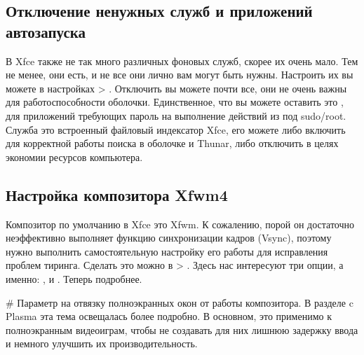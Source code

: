 \documentclass[letterpaper,10pt,russian,openany]{sphinxmanual}
\begin{document}
\subsection{Отключение ненужных служб и приложений автозапуска}
\label{\detokenize{source/de-optimizations:disabling-xfce-daemons}}\label{\detokenize{source/de-optimizations:index-19}}\label{\detokenize{source/de-optimizations:id9}}
\sphinxAtStartPar
В Xfce также не так много различных фоновых служб, скорее их очень мало.
Тем не менее, они есть, и не все они лично вам могут быть нужны.
Настроить их вы можете в настройках  \sphinxhyphen{}> .
Отключить вы можете почти все, они не очень важны для работоспособности оболочки.
Единственное, что вы можете оставить \sphinxhyphen{} это , для приложений требующих пароль на выполнение действий из под sudo/root.
Служба  \sphinxhyphen{} это встроенный файловый индексатор Xfce, его можете либо включить для корректной работы поиска в оболочке и Thunar,
либо отключить в целях экономии ресурсов компьютера.

\noindent{}

\ignorespaces 

\subsection{Настройка композитора Xfwm4}
\label{\detokenize{source/de-optimizations:xfwm4}}\label{\detokenize{source/de-optimizations:lowlatency-xfwm}}\label{\detokenize{source/de-optimizations:index-20}}
\sphinxAtStartPar
Композитор по умолчанию в Xfce это Xfwm.
К сожалению, порой он достаточно неэффективно выполняет функцию синхронизации кадров (Vsync),
поэтому нужно выполнить самостоятельную настройку его работы для исправления проблем тиринга.
Сделать это можно в  \sphinxhyphen{}> .
Здесь нас интересуют три опции, а именно: ,  и . Теперь подробнее.

\sphinxAtStartPar
{} \# Параметр на отвязку полноэкранных окон от работы композитора.
В разделе c Plasma эта тема освещалась более подробно.
В основном, это применимо к полноэкранным видеоиграм, чтобы не создавать для них лишнюю задержку ввода и немного улучшить их производительность.
\end{document}
